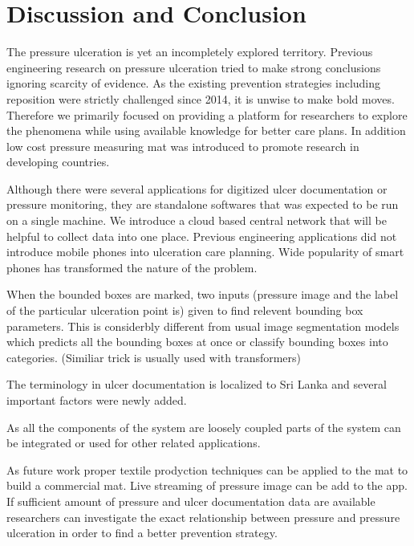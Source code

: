 \chapter{Discussion and Conclusion}

The pressure ulceration is yet an incompletely explored territory. Previous engineering research on pressure ulceration tried to make strong conclusions ignoring scarcity of evidence. As the existing prevention strategies including reposition were strictly challenged since 2014, it is unwise to make bold moves. Therefore we primarily focused on providing a platform for researchers to explore the phenomena while using available knowledge for better care plans. In addition low cost pressure measuring mat was introduced to promote research in developing countries. 

Although there were several applications for digitized ulcer documentation or pressure monitoring, they are standalone softwares that was expected to be run on a single machine. We introduce a cloud based central network that will be helpful to collect data into one place. Previous engineering applications did not introduce mobile phones into ulceration care planning. Wide popularity of smart phones has transformed the nature of the problem. 

When the bounded boxes are marked, two inputs (pressure image and the label of the particular ulceration point is) given to find relevent bounding box parameters. This is considerbly different from usual image segmentation models which predicts all the bounding boxes at once or classify bounding boxes into categories. (Similiar trick is usually used with transformers) 

The terminology in ulcer documentation is localized to Sri Lanka and several important factors were newly added.

As all the components of the system are loosely coupled parts of the system can be integrated or used for other related applications.

As future work proper textile prodyction techniques can be applied to the mat to build a commercial mat. Live streaming of pressure image can be add to the app. If sufficient amount of pressure and ulcer documentation data are available researchers can investigate the exact relationship between pressure and pressure ulceration in order to find a better prevention strategy.


